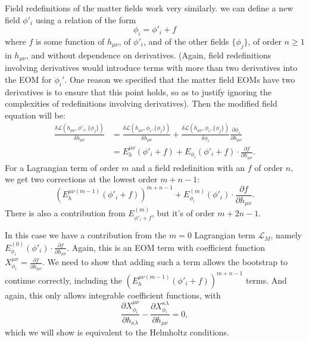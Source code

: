 \documentclass[aps,physrev,preprint,groupedaddress]{revtex4-2}
\begin{document}
Field redefinitions of the matter fields work very similarly. we can define a new field \(\phi'_i\) using a relation of the form 
\begin{equation}
    \phi_i=\phi'_i+f
\end{equation}
where \(f\) is some function of \(h_{\mu\nu}\), of \(\phi'_i\), and of the other fields \(\{\phi_j\}\), of order \(n\ge 1\) in \(h_{\mu\nu}\), and without dependence on derivatives. (Again, field redefinitions involving derivatives would introduce terms with more than two derivatives into the EOM for \(\phi_i'\). One reason we specified that the matter field EOMs have two derivatives is to ensure that this point holds, so as to justify ignoring the complexities of redefinitions involving derivatives). Then the modified field equation will be:
\begin{equation}\begin{split}
    \frac{\delta\mathcal{L}(h_{\mu\nu},\phi'_i,\{\phi_j\})}{\delta h_{\mu\nu}}&=\frac{\delta\mathcal{L}(h_{\mu\nu},\phi_i,\{\phi_j\})}{\delta h_{\mu\nu}}+\frac{\delta\mathcal{L}(h_{\mu\nu},\phi_i,\{\phi_j\})}{\delta \phi_i}\frac{\partial \phi_i}{\partial h_{\mu\nu}}\\
    &=E_h^{\mu\nu}(\phi'_i+f)+E_{\phi_i}(\phi'_i+f)\cdot\frac{\partial f}{\partial h_{\mu\nu}}.
\end{split}\end{equation}
For a Lagrangian term of order \(m\) and a field redefinition with an \(f\) of order \(n\), we get two corrections at the lowest order \(m+n-1\):
\begin{equation}
\left(E_h^{\mu\nu(m-1)}(\phi'_i+f)\right)^{m+n-1}+E^{(m)}_{\phi_i}(\phi'_i)\cdot\frac{\partial f}{\partial h_{\mu\nu}}.
\end{equation}
There is also a contribution from \(E^{(m)}_{\phi'_i+f}\), but it's of order \(m+2n-1\). 

In this case we have a contribution from the \(m=0\) Lagrangian term \(\mathcal{L}_M\), namely \(E^{(0)}_{\phi_i}(\phi'_i)\cdot\frac{\partial f}{\partial h_{\mu\nu}}\). Again, this is an EOM term with coefficient function \(X_{\phi_i}^{\mu\nu}=\frac{\partial f}{\partial h_{\mu\nu}}\). We need to show that adding such a term allows the bootstrap to continue correctly, including the \(\left(E_h^{\mu\nu(m-1)}(\phi'_i+f)\right)^{m+n-1}\) terms. And again, this only allows integrable coefficient functions, with
\begin{equation}
\frac{\partial X_{\phi_i}^{\mu\nu}}{\partial h_{\kappa\lambda}}-\frac{\partial X_{\phi_i}^{\kappa\lambda}}{\partial h_{\mu\nu}}=0,
\end{equation}
which we will show is equivalent to the Helmholtz conditions. 
\end{document}
